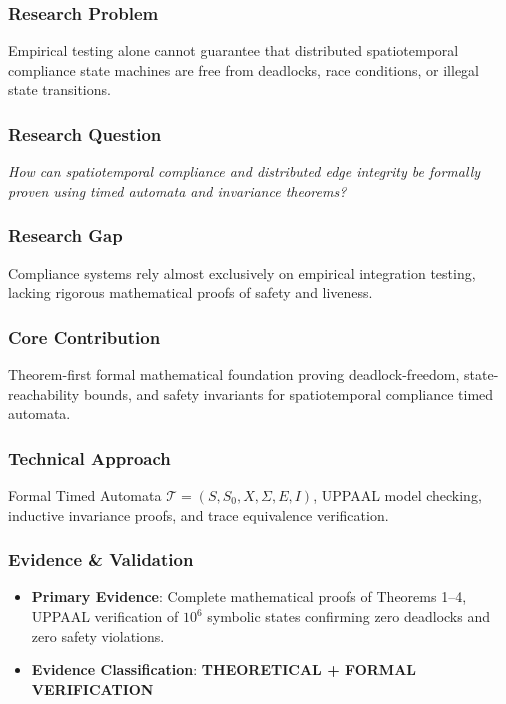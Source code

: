 \documentclass[11pt,letterpaper]{article}
\begin{document}
\subsubsection{Research Problem}
Empirical testing alone cannot guarantee that distributed spatiotemporal compliance state machines are free from deadlocks, race conditions, or illegal state transitions.

\subsubsection{Research Question}
\begin{tcolorbox}[colback=blue!3!white,colframe=blue!50!black,title=Primary Scientific Question]
\textit{How can spatiotemporal compliance and distributed edge integrity be formally proven using timed automata and invariance theorems?}
\end{tcolorbox}

\subsubsection{Research Gap}
Compliance systems rely almost exclusively on empirical integration testing, lacking rigorous mathematical proofs of safety and liveness.

\subsubsection{Core Contribution}
Theorem-\allowbreak first formal mathematical foundation proving deadlock-\allowbreak freedom, state-\allowbreak reachability bounds, and safety invariants for spatiotemporal compliance timed automata.

\subsubsection{Technical Approach}
Formal Timed Automata $\mathcal{T} = (S, S_0, X, \Sigma, E, I)$, UPPAAL model checking, inductive invariance proofs, and trace equivalence verification.

\subsubsection{Evidence \& Validation}
\begin{itemize}[leftmargin=*]
    \item \textbf{Primary Evidence}: Complete mathematical proofs of Theorems 1–4, UPPAAL verification of $10^6$ symbolic states confirming zero deadlocks and zero safety violations.
    \item \textbf{Evidence Classification}: \textbf{THEORETICAL + FORMAL VERIFICATION}
\end{itemize}
\end{document}
